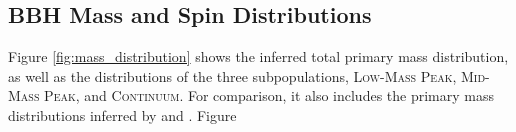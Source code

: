 \subsection{BBH Mass and Spin Distributions}

Figure \ref{fig:mass_distribution} shows the inferred total primary mass distribution, as well as the distributions of the three subpopulations, \textsc{Low-Mass Peak}, \textsc{Mid-Mass Peak}, and \textsc{Continuum}. For comparison, it also includes the primary mass distributions inferred by  and . Figure 